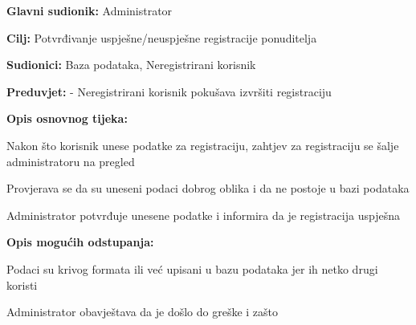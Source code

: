                     \noindent {}
					\begin{packed_item}
	
						\item \textbf{Glavni sudionik: } Administrator
						\item  \textbf{Cilj:} Potvrđivanje uspješne/neuspješne registracije ponuditelja
						\item  \textbf{Sudionici:} Baza podataka, Neregistrirani korisnik
						\item  \textbf{Preduvjet:} - Neregistrirani korisnik pokušava izvršiti registraciju
						\item  \textbf{Opis osnovnog tijeka:}
						
						\item[] \begin{packed_enum}
	
							\item Nakon što korisnik unese podatke za registraciju, zahtjev za registraciju se šalje administratoru na pregled
							\item Provjerava se da su uneseni podaci dobrog oblika i da ne postoje u bazi podataka
                            \item Administrator potvrđuje unesene podatke i informira da je registracija uspješna
						\end{packed_enum}
						
						\item  \textbf{Opis mogućih odstupanja:}
						
						\item[] \begin{packed_item}
	
							\item[2.a] Podaci su krivog formata ili već upisani u bazu podataka jer ih netko drugi koristi
							\item[] \begin{packed_enum}			
								\item Administrator obavještava da je došlo do greške i zašto
							\end{packed_enum}
						\end{packed_item}
					\end{packed_item}

